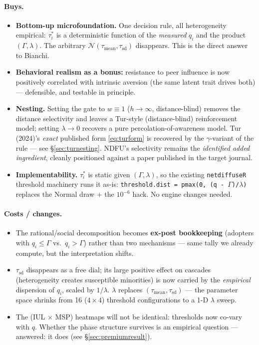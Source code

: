 \documentclass[11pt,a4paper]{article}
\newcommand{\code}[1]{\texttt{#1}}
\begin{document}
\paragraph{Buys.}
\begin{itemize}
  \item \textbf{Bottom-up microfoundation.} One decision rule, all heterogeneity
    empirical: $\tau_i^{*}$ is a deterministic function of the \emph{measured} $q_i$ and
    the product $(\Gamma, \lambda)$. The arbitrary
    $\mathcal{N}(\tau_{\text{mean}}, \tau_{\text{sd}})$ disappears. This is the direct
    answer to Bianchi.
  \item \textbf{Behavioral realism as a bonus:} resistance to peer influence is now
    positively correlated with intrinsic aversion (the same latent trait drives both) ---
    defensible, and testable in principle.
  \item \textbf{Nesting.} Setting the gate to $w \equiv 1$ ($h \to \infty$,
    distance-blind) removes the distance selectivity and leaves a Tur-style
    (distance-blind) reinforcement model; setting $\lambda \to 0$ recovers a pure
    percolation-of-awareness model. Tur (2024)'s \emph{exact} published form
    \eqref{eq:turform} is recovered by the $\gamma$-variant of the rule --- see
    \S\ref{sec:turnesting}. NDFU's selectivity remains the \emph{identified added
    ingredient}, cleanly positioned against a paper published in the target journal.
  \item \textbf{Implementability.} $\tau_i^{*}$ is static given $(\Gamma, \lambda)$, so
    the existing \code{netdiffuseR} threshold machinery runs it as-is:
    \code{threshold.dist = pmax(0, (q - $\Gamma$)/$\lambda$)} replaces the Normal draw
    $+$ the $10^{-6}$ hack. No engine changes needed.
\end{itemize}

\paragraph{Costs / changes.}
\begin{itemize}
  \item The rational/social decomposition becomes \textbf{ex-post bookkeeping} (adopters
    with $q_i \le \Gamma$ vs.\ $q_i > \Gamma$) rather than two mechanisms --- same tally
    we already compute, but the interpretation shifts.
  \item $\tau_{\text{sd}}$ disappears as a free dial; its large positive effect on
    cascades (heterogeneity creates susceptible minorities) is now carried by the
    \emph{empirical} dispersion of $q_i$, scaled by $1/\lambda$. $\lambda$ replaces
    $(\tau_{\text{mean}}, \tau_{\text{sd}})$ --- the parameter space shrinks from 16
    ($4\times4$) threshold configurations to a 1-D $\lambda$ sweep.
  \item The (IUL $\times$ MSP) heatmaps will not be identical: thresholds now co-vary
    with $q$. Whether the phase structure survives is an empirical question --- answered:
    it does (see \S\ref{sec:premiumresult}).
\end{itemize}
\end{document}
